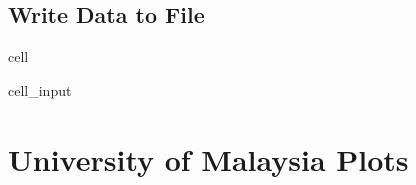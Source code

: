 \documentclass[letterpaper,10pt,english]{jupyterBook}
\begin{document}
\subsection{Write Data to File}
\label{\detokenize{notebooks/data_exploration:write-data-to-file}}
\begin{sphinxuseclass}{cell}\begin{sphinxVerbatimInput}

\begin{sphinxuseclass}{cell_input}
\begin{sphinxVerbatim}[commandchars=\\\{\}]
  

\end{sphinxVerbatim}

\end{sphinxuseclass}\end{sphinxVerbatimInput}

\end{sphinxuseclass}

\section{University of Malaysia Plots}
\label{\detokenize{notebooks/data_exploration:university-of-malaysia-plots}}
\end{document}
